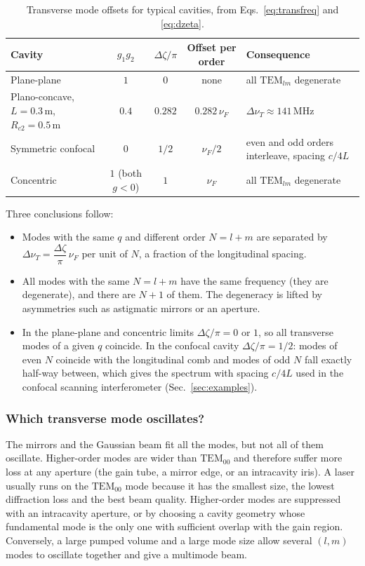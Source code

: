 \documentclass[11pt,a4paper]{article}
\begin{document}
	\begin{table}[ht]
		\centering
		\small
		\begin{tabular}{@{}p{3.6cm}cccp{4.6cm}@{}}
			\toprule
			Cavity & $g_1g_2$ & $\Delta\zeta/\pi$ & Offset per order & Consequence\\
			\midrule
			Plane-plane & $1$ & $0$ & none & all $\mathrm{TEM}_{lm}$ degenerate\\
			Plano-concave, $L=0.3$\,m, $R_{c2}=0.5$\,m & $0.4$ & $0.282$ & $0.282\,\nu_F$ & $\Delta\nu_T\approx141$\,MHz\\
			Symmetric confocal & $0$ & $1/2$ & $\nu_F/2$ & even and odd orders interleave, spacing $c/4L$\\
			Concentric & $1$ (both $g<0$) & $1$ & $\nu_F$ & all $\mathrm{TEM}_{lm}$ degenerate\\
			\bottomrule
		\end{tabular}
		\caption{Transverse mode offsets for typical cavities, from Eqs.~\eqref{eq:transfreq} and \eqref{eq:dzeta}.}
		\label{tab:dzeta}
	\end{table}
	
	Three conclusions follow:
	\begin{itemize}
		\item Modes with the same $q$ and different order $N=l+m$ are separated by $\Delta\nu_T=\dfrac{\Delta\zeta}{\pi}\,\nu_F$ per unit of $N$, a fraction of the longitudinal spacing.
		\item All modes with the same $N=l+m$ have the same frequency (they are degenerate), and there are $N+1$ of them. The degeneracy is lifted by asymmetries such as astigmatic mirrors or an aperture.
		\item In the plane-plane and concentric limits $\Delta\zeta/\pi=0$ or $1$, so all transverse modes of a given $q$ coincide. In the confocal cavity $\Delta\zeta/\pi=1/2$: modes of even $N$ coincide with the longitudinal comb and modes of odd $N$ fall exactly half-way between, which gives the spectrum with spacing $c/4L$ used in the confocal scanning interferometer (Sec.~\ref{sec:examples}).
	\end{itemize}
	
	
	\subsubsection*{Which transverse mode oscillates?}
	
	The mirrors and the Gaussian beam fit all the modes, but not all of them oscillate. Higher-order modes are wider than $\mathrm{TEM}_{00}$ and therefore suffer more loss at any aperture (the gain tube, a mirror edge, or an intracavity iris). A laser usually runs on the $\mathrm{TEM}_{00}$ mode because it has the smallest size, the lowest diffraction loss and the best beam quality. Higher-order modes are suppressed with an intracavity aperture, or by choosing a cavity geometry whose fundamental mode is the only one with sufficient overlap with the gain region. Conversely, a large pumped volume and a large mode size allow several $(l,m)$ modes to oscillate together and give a multimode beam.
	
\end{document}

